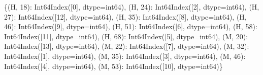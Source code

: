 \documentclass[
  spanish,
  a4paper,
]{scrreport}
\newenvironment{Shaded}{\begin{snugshade}}{\end{snugshade}}
\newcommand{\DecValTok}[1]{\textcolor[rgb]{0.68,0.00,0.00}{#1}}
\newcommand{\NormalTok}[1]{\textcolor[rgb]{0.00,0.23,0.31}{#1}}
\newcommand{\OperatorTok}[1]{\textcolor[rgb]{0.37,0.37,0.37}{#1}}
\newcommand{\StringTok}[1]{\textcolor[rgb]{0.13,0.47,0.30}{#1}}
\begin{document}
\begin{Shaded}
\begin{Highlighting}[]
\NormalTok{\{(}\StringTok{\textquotesingle{}H\textquotesingle{}}\NormalTok{, }\DecValTok{18}\NormalTok{): Int64Index([}\DecValTok{0}\NormalTok{], dtype}\OperatorTok{=}\StringTok{\textquotesingle{}int64\textquotesingle{}}\NormalTok{), (}\StringTok{\textquotesingle{}H\textquotesingle{}}\NormalTok{, }\DecValTok{24}\NormalTok{): Int64Index([}\DecValTok{2}\NormalTok{], dtype}\OperatorTok{=}\StringTok{\textquotesingle{}int64\textquotesingle{}}\NormalTok{), (}\StringTok{\textquotesingle{}H\textquotesingle{}}\NormalTok{, }\DecValTok{27}\NormalTok{): Int64Index([}\DecValTok{12}\NormalTok{], dtype}\OperatorTok{=}\StringTok{\textquotesingle{}int64\textquotesingle{}}\NormalTok{), (}\StringTok{\textquotesingle{}H\textquotesingle{}}\NormalTok{, }\DecValTok{35}\NormalTok{): Int64Index([}\DecValTok{8}\NormalTok{], dtype}\OperatorTok{=}\StringTok{\textquotesingle{}int64\textquotesingle{}}\NormalTok{), (}\StringTok{\textquotesingle{}H\textquotesingle{}}\NormalTok{, }\DecValTok{46}\NormalTok{): Int64Index([}\DecValTok{9}\NormalTok{], dtype}\OperatorTok{=}\StringTok{\textquotesingle{}int64\textquotesingle{}}\NormalTok{), (}\StringTok{\textquotesingle{}H\textquotesingle{}}\NormalTok{, }\DecValTok{51}\NormalTok{): Int64Index([}\DecValTok{6}\NormalTok{], dtype}\OperatorTok{=}\StringTok{\textquotesingle{}int64\textquotesingle{}}\NormalTok{), (}\StringTok{\textquotesingle{}H\textquotesingle{}}\NormalTok{, }\DecValTok{58}\NormalTok{): Int64Index([}\DecValTok{11}\NormalTok{], dtype}\OperatorTok{=}\StringTok{\textquotesingle{}int64\textquotesingle{}}\NormalTok{), (}\StringTok{\textquotesingle{}H\textquotesingle{}}\NormalTok{, }\DecValTok{68}\NormalTok{): Int64Index([}\DecValTok{5}\NormalTok{], dtype}\OperatorTok{=}\StringTok{\textquotesingle{}int64\textquotesingle{}}\NormalTok{), (}\StringTok{\textquotesingle{}M\textquotesingle{}}\NormalTok{, }\DecValTok{20}\NormalTok{): Int64Index([}\DecValTok{13}\NormalTok{], dtype}\OperatorTok{=}\StringTok{\textquotesingle{}int64\textquotesingle{}}\NormalTok{), (}\StringTok{\textquotesingle{}M\textquotesingle{}}\NormalTok{, }\DecValTok{22}\NormalTok{): Int64Index([}\DecValTok{7}\NormalTok{], dtype}\OperatorTok{=}\StringTok{\textquotesingle{}int64\textquotesingle{}}\NormalTok{), (}\StringTok{\textquotesingle{}M\textquotesingle{}}\NormalTok{, }\DecValTok{32}\NormalTok{): Int64Index([}\DecValTok{1}\NormalTok{], dtype}\OperatorTok{=}\StringTok{\textquotesingle{}int64\textquotesingle{}}\NormalTok{), (}\StringTok{\textquotesingle{}M\textquotesingle{}}\NormalTok{, }\DecValTok{35}\NormalTok{): Int64Index([}\DecValTok{3}\NormalTok{], dtype}\OperatorTok{=}\StringTok{\textquotesingle{}int64\textquotesingle{}}\NormalTok{), (}\StringTok{\textquotesingle{}M\textquotesingle{}}\NormalTok{, }\DecValTok{46}\NormalTok{): Int64Index([}\DecValTok{4}\NormalTok{], dtype}\OperatorTok{=}\StringTok{\textquotesingle{}int64\textquotesingle{}}\NormalTok{), (}\StringTok{\textquotesingle{}M\textquotesingle{}}\NormalTok{, }\DecValTok{53}\NormalTok{): Int64Index([}\DecValTok{10}\NormalTok{], dtype}\OperatorTok{=}\StringTok{\textquotesingle{}int64\textquotesingle{}}\NormalTok{)\}}
\end{Highlighting}
\end{Shaded}
\end{document}
